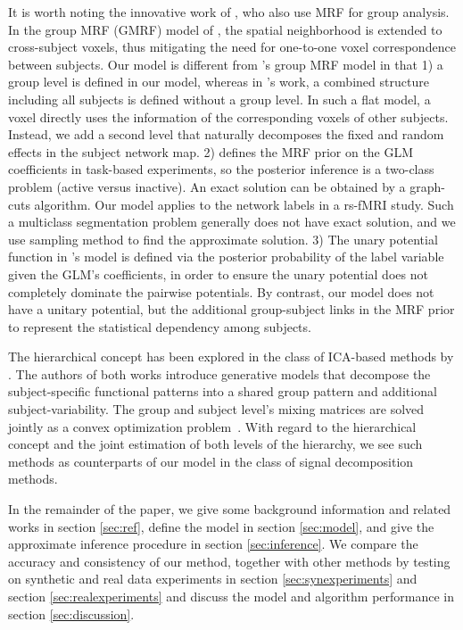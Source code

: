 \documentclass[review,authoryear]{elsarticle}
\begin{document}
It is worth noting the innovative work of \citet{ng2012modeling}, who also use
MRF for group analysis. In the group MRF (GMRF) model of
\citeauthor{ng2012modeling}, the spatial neighborhood is extended to
cross-subject voxels, thus mitigating the need for one-to-one voxel
correspondence between subjects. Our model is different from
\citeauthor{ng2012modeling}'s group MRF model in that 1) a group level is
defined in our model, whereas in \citeauthor{ng2012modeling}'s work, a combined
structure including all subjects is defined without a group level. In such a
flat model, a voxel directly uses the information of the corresponding voxels of
other subjects. Instead, we add a second level that naturally decomposes the
fixed and random effects in the subject network map. 2)
\citeauthor{ng2012modeling} defines the MRF prior on the GLM coefficients in
task-based experiments, so the posterior inference is a two-class problem
(active versus inactive). An exact solution can be obtained by a graph-cuts
algorithm. Our model applies to the network labels in a rs-fMRI study. Such a
multiclass segmentation problem generally does not have exact solution, and we
use sampling method to find the approximate solution. 3) The unary potential
function in \citeauthor{ng2012modeling}'s model is defined via the posterior
probability of the label variable given the GLM's coefficients, in order to
ensure the unary potential does not completely dominate the pairwise
potentials. By contrast, our model does not have a unitary potential, but the
additional group-subject links in the MRF prior to represent the statistical
dependency among subjects.

The hierarchical concept has been explored in the class of ICA-based methods by
\citet{varoquaux2010group, varoquaux2011multi}. The authors of both works
introduce generative models that decompose the subject-specific functional
patterns into a shared group pattern and additional subject-variability. The
group and subject level's mixing matrices are solved jointly as a convex
optimization problem~\citep{varoquaux2011multi}. With regard to the hierarchical
concept and the joint estimation of both levels of the hierarchy, we see such
methods as counterparts of our model in the class of signal decomposition
methods.

In the remainder of the paper, we give some background information and related
works in section \ref{sec:ref}, define the model in section \ref{sec:model}, and
give the approximate inference procedure in section \ref{sec:inference}. We
compare the accuracy and consistency of our method, together with other methods
by testing on synthetic and real data experiments in section
\ref{sec:synexperiments} and section \ref{sec:realexperiments} and discuss the
model and algorithm performance in section \ref{sec:discussion}.
\end{document}
